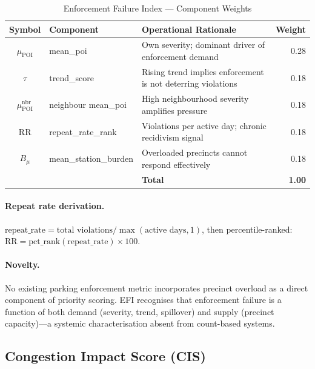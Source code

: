 \documentclass[12pt,a4paper]{article}
\begin{document}
\begin{table}[htbp]
\centering
\caption{Enforcement Failure Index — Component Weights}
\label{tab:efi}
\begin{tabularx}{\textwidth}{@{}clXr@{}}
\toprule
\textbf{Symbol} & \textbf{Component} & \textbf{Operational Rationale} & \textbf{Weight}\\
\midrule
$\mu_{\mathrm{POI}}$           & mean\_poi            & Own severity; dominant driver of enforcement demand          & 0.28\\
$\tau$                          & trend\_score         & Rising trend implies enforcement is not deterring violations & 0.18\\
$\mu_{\mathrm{POI}}^{\mathrm{nbr}}$ & neighbour mean\_poi & High neighbourhood severity amplifies pressure            & 0.18\\
$\mathrm{RR}$                   & repeat\_rate\_rank   & Violations per active day; chronic recidivism signal         & 0.18\\
$B_\mu$                         & mean\_station\_burden& Overloaded precincts cannot respond effectively              & 0.18\\
\midrule
& & \textbf{Total} & \textbf{1.00}\\
\bottomrule
\end{tabularx}
\end{table}

\paragraph{Repeat rate derivation.}
$\mathrm{repeat\_rate} = \text{total violations} / \max(\text{active days}, 1)$, then
percentile-ranked: $\mathrm{RR} = \mathrm{pct\_rank}(\mathrm{repeat\_rate}) \times 100$.

\paragraph{Novelty.}
No existing parking enforcement metric incorporates precinct overload as a direct component
of priority scoring. EFI recognises that enforcement failure is a function of both demand
(severity, trend, spillover) and supply (precinct capacity)—a systemic characterisation
absent from count-based systems.

\subsection{Congestion Impact Score (CIS)}
\end{document}
